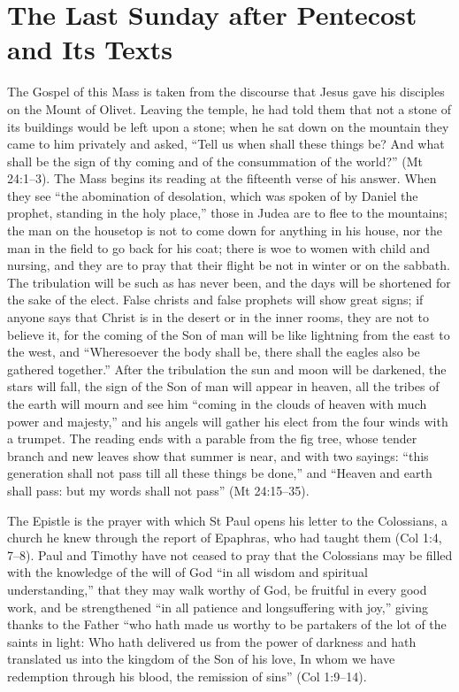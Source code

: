 \section{The Last Sunday after Pentecost and Its Texts}
\label{sec:opening}

The Gospel of this Mass is taken from the discourse that Jesus gave his
disciples on the Mount of Olivet. Leaving the temple, he had told them that
not a stone of its buildings would be left upon a stone; when he sat down on
the mountain they came to him privately and asked, ``Tell us when shall these
things be? And what shall be the sign of thy coming and of the consummation of
the world?'' (Mt 24:1--3). The Mass begins its reading at the fifteenth verse
of his answer. When they see ``the abomination of desolation, which was spoken
of by Daniel the prophet, standing in the holy place,'' those in Judea are to
flee to the mountains; the man on the housetop is not to come down for
anything in his house, nor the man in the field to go back for his coat; there
is woe to women with child and nursing, and they are to pray that their flight
be not in winter or on the sabbath. The tribulation will be such as has never
been, and the days will be shortened for the sake of the elect. False christs
and false prophets will show great signs; if anyone says that Christ is in the
desert or in the inner rooms, they are not to believe it, for the coming of the
Son of man will be like lightning from the east to the west, and ``Wheresoever
the body shall be, there shall the eagles also be gathered together.'' After
the tribulation the sun and moon will be darkened, the stars will fall, the
sign of the Son of man will appear in heaven, all the tribes of the earth will
mourn and see him ``coming in the clouds of heaven with much power and
majesty,'' and his angels will gather his elect from the four winds with a
trumpet. The reading ends with a parable from the fig tree, whose tender
branch and new leaves show that summer is near, and with two sayings: ``this
generation shall not pass till all these things be done,'' and ``Heaven and
earth shall pass: but my words shall not pass'' (Mt 24:15--35).

The Epistle is the prayer with which St Paul opens his letter to the
Colossians, a church he knew through the report of Epaphras, who had taught
them (Col 1:4, 7--8). Paul and Timothy have not ceased to pray that the
Colossians may be filled with the knowledge of the will of God ``in all wisdom
and spiritual understanding,'' that they may walk worthy of God, be fruitful in
every good work, and be strengthened ``in all patience and longsuffering with
joy,'' giving thanks to the Father ``who hath made us worthy to be partakers of
the lot of the saints in light: Who hath delivered us from the power of
darkness and hath translated us into the kingdom of the Son of his love, In
whom we have redemption through his blood, the remission of sins'' (Col
1:9--14).

